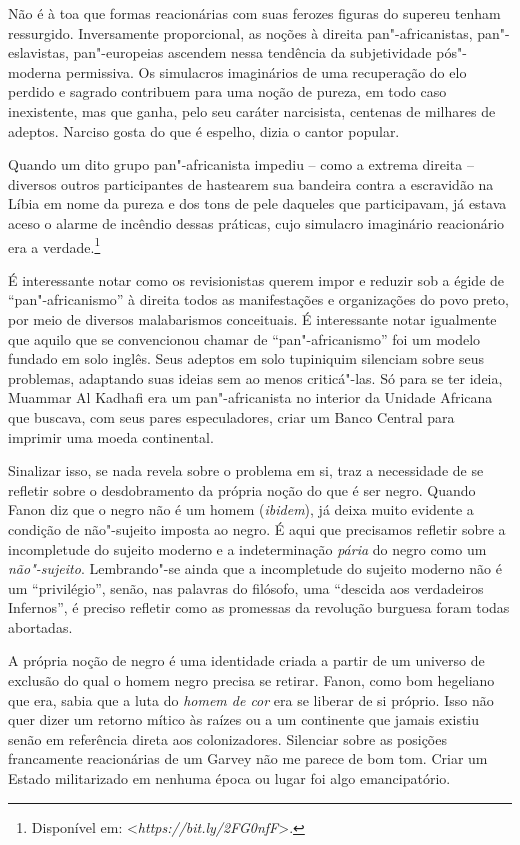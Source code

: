 Não é à toa que formas reacionárias com suas ferozes figuras do supereu
tenham ressurgido. Inversamente proporcional, as noções à direita
pan"-africanistas, pan"-eslavistas, pan"-europeias ascendem nessa tendência
da subjetividade pós"-moderna permissiva. Os simulacros imaginários de
uma recuperação do elo perdido e sagrado contribuem para uma noção de
pureza, em todo caso inexistente, mas que ganha, pelo seu caráter
narcisista, centenas de milhares de adeptos. Narciso gosta do que é
espelho, dizia o cantor popular.

Quando um dito grupo pan"-africanista impediu -- como a extrema direita
-- diversos outros participantes de hastearem sua bandeira contra a
escravidão na Líbia em nome da pureza e dos tons de pele daqueles que
participavam, já estava aceso o alarme de incêndio dessas práticas, cujo
simulacro imaginário reacionário era a
verdade.\footnote{Disponível em:
  \textless{}\emph{https://bit.ly/2FG0nfF}\textgreater{}.}

É interessante notar como os revisionistas querem impor e reduzir sob a
égide de ``pan"-africanismo'' à direita todos as manifestações e
organizações do povo preto, por meio de diversos malabarismos
conceituais. É interessante notar igualmente que aquilo que se
convencionou chamar de ``pan"-africanismo'' foi um modelo fundado em solo
inglês. Seus adeptos em solo tupiniquim silenciam sobre seus problemas,
adaptando suas ideias sem ao menos criticá"-las. Só para se ter ideia,
Muammar Al Kadhafi era um
pan"-africanista no interior da Unidade Africana que buscava, com seus
pares especuladores, criar um Banco Central para imprimir uma moeda
continental.

Sinalizar isso, se nada revela sobre o problema em si, traz a
necessidade de se refletir sobre o desdobramento da própria noção do que
é ser negro. Quando Fanon diz que o negro não é um homem (\emph{ibidem}), já
deixa muito evidente a condição de não"-sujeito imposta ao negro. É aqui
que precisamos refletir sobre a incompletude do sujeito moderno e a
indeterminação \emph{pária} do negro como um \emph{não"-sujeito}.
Lembrando"-se ainda que a incompletude do sujeito moderno não é um
``privilégio'', senão, nas palavras do filósofo, uma ``descida aos
verdadeiros Infernos'', é preciso refletir como as promessas da
revolução burguesa foram todas abortadas.

A própria noção de negro é uma identidade criada a partir de um universo
de exclusão do qual o homem negro precisa se retirar. Fanon, como bom
hegeliano que era, sabia que a luta do \emph{homem de cor} era se
liberar de si próprio. Isso não quer dizer um retorno mítico às raízes
ou a um continente que jamais existiu senão em referência direta aos
colonizadores. Silenciar sobre as posições francamente reacionárias de
um Garvey não me parece de bom tom. Criar um Estado militarizado em
nenhuma época ou lugar foi algo emancipatório.

